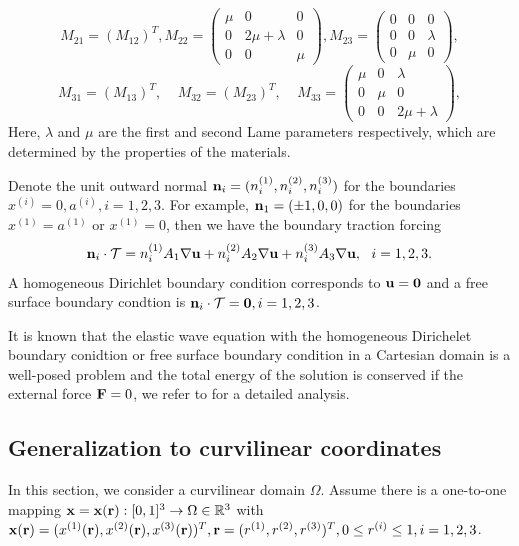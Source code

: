\documentclass[a4paper]{article}
\begin{document}
\[ M_{21} =(M_{12})^T, M_{22} = \left(\begin{array}{ccc}
\mu & 0 & 0\\
0 & 2\mu+\lambda & 0\\
0 & 0 & \mu\end{array}\right), M_{23} = \left(\begin{array}{ccc}
0 & 0 & 0\\
0 & 0 & \lambda\\
0 & \mu & 0\end{array}\right),\]
\[ M_{31} = (M_{13})^T, \ \ \ \ \ M_{32} =(M_{23})^T, \ \ \ \ \ M_{33} = \left(\begin{array}{ccc}
\mu & 0 & \lambda\\
0 & \mu & 0\\
0 & 0 & 2\mu+\lambda\end{array}\right),\]
Here, $\lambda$ and $\mu$ are the first and second Lame parameters respectively, which are determined by the properties of the materials.

Denote the unit outward normal ${\bf n}_i = (n_i^{(1)},n_i^{(2)},n_i^{(3)})$ for the boundaries $x^{(i)} = 0, a^{(i)}, i = 1,2,3$. For example, ${\bf n}_1 = (\pm 1, 0,0)$ for the boundaries $x^{(1)} = a^{(1)}$ or $x^{(1)} = 0$, then we have the boundary traction forcing 
\begin{equation*}
{\bf n}_i\cdot\mathcal{T} = n^{(1)}_iA_1\nabla{\bf u} + n^{(2)}_iA_2\nabla{\bf u} + n^{(3)}_iA_3\nabla{\bf u},\ \ i = 1,2,3. 
\end{equation*}
A homogeneous Dirichlet boundary condition corresponds to ${\bf u} = {\bf 0}$ and a free surface boundary condtion is ${\bf n}_i\cdot\mathcal{T}  = {\bf 0}, i = 1,2,3$.

It is known that the elastic wave equation with the homogeneous Dirichelet boundary conidtion or free surface boundary condition in a Cartesian domain is a well-posed problem and the total energy of the solution is conserved if the external force ${\bf F} = 0$, we refer to \cite{?} for a detailed analysis.

\subsection{Generalization to curvilinear coordinates}

In this section, we consider a curvilinear domain $\Omega$. Assume there is a one-to-one mapping ${\bf x} = {\bf x}({\bf r}) : [0,1]^3 \rightarrow \Omega \in \mathbb{R}^3$ with ${\bf x}({\bf r}) = (x^{(1)}({\bf r}),x^{(2)}({\bf r}),x^{(3)}({\bf r}))^T, {\bf r} = (r^{(1)},r^{(2)},r^{(3)})^T, 0\leq r^{(i)}\leq1, i = 1,2,3$.
\end{document}
